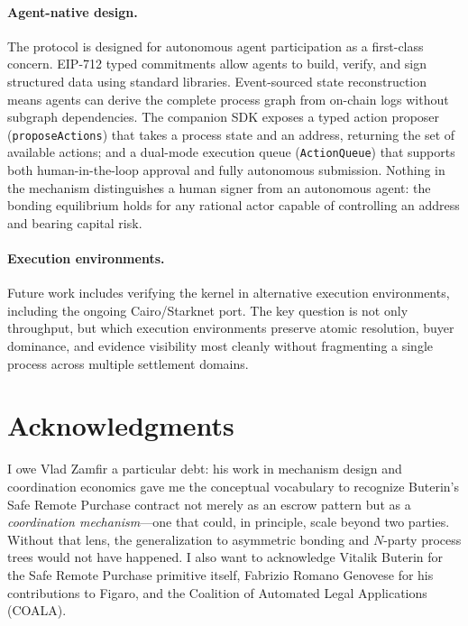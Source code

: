 \documentclass[11pt,a4paper]{article}
\theoremstyle{definition}
\theoremstyle{remark}
\begin{document}
\paragraph{Agent-native design.}
The protocol is designed for autonomous agent participation as a
first-class concern. EIP-712 typed commitments allow agents to build,
verify, and sign structured data using standard libraries. Event-sourced
state reconstruction means agents can derive the complete process graph
from on-chain logs without subgraph dependencies. The companion SDK
exposes a typed action proposer (\texttt{proposeActions}) that takes a
process state and an address, returning the set of available actions;
and a dual-mode execution queue (\texttt{ActionQueue}) that supports
both human-in-the-loop approval and fully autonomous submission. Nothing
in the mechanism distinguishes a human signer from an autonomous agent:
the bonding equilibrium holds for any rational actor capable of
controlling an address and bearing capital risk.

\paragraph{Execution environments.}
Future work includes verifying the kernel in alternative execution
environments, including the ongoing Cairo/Starknet port. The key
question is not only throughput, but which execution environments
preserve atomic resolution, buyer dominance, and evidence visibility
most cleanly without fragmenting a single process across multiple
settlement domains.

\section*{Acknowledgments}
I owe Vlad Zamfir a particular debt: his work in mechanism design and
coordination economics gave me the conceptual vocabulary to recognize
Buterin's Safe Remote Purchase contract not merely as an escrow pattern
but as a \emph{coordination mechanism}---one that could, in principle,
scale beyond two parties. Without that lens, the generalization to
asymmetric bonding and $N$-party process trees would not have
happened. I also want to acknowledge Vitalik Buterin for the Safe
Remote Purchase primitive itself, Fabrizio Romano Genovese for his
contributions to Figaro, and the Coalition of Automated Legal
Applications (COALA).


\end{document}
